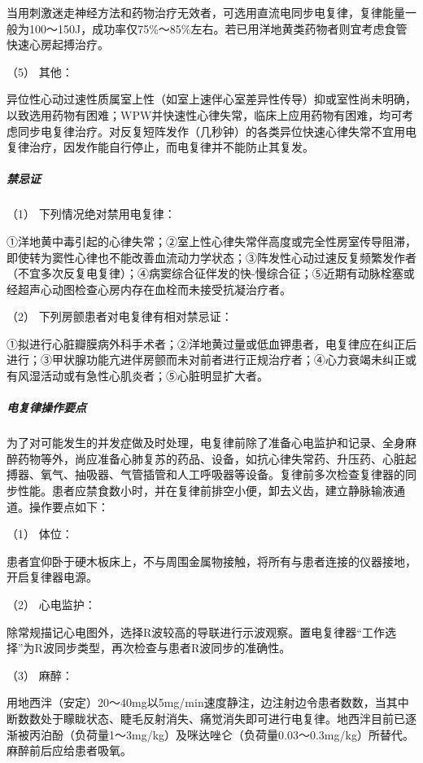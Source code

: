 当用刺激迷走神经方法和药物治疗无效者，可选用直流电同步电复律，复律能量一般为100～150J，成功率仅75\%～85\%左右。若已用洋地黄类药物者则宜考虑食管快速心房起搏治疗。

\hypertarget{text00373.htmlux5cux23CHP16-4-4-1-5}{}
（5） 其他：

异位性心动过速性质属室上性（如室上速伴心室差异性传导）抑或室性尚未明确，以致选用药物有困难；WPW并快速性心律失常，临床上应用药物有困难，均可考虑同步电复律治疗。对反复短阵发作（几秒钟）的各类异位快速心律失常不宜用电复律治疗，因发作能自行停止，而电复律并不能防止其复发。

\subparagraph{禁忌证}

\hypertarget{text00373.htmlux5cux23CHP16-4-4-2-1}{}
（1） 下列情况绝对禁用电复律：

①洋地黄中毒引起的心律失常；②室上性心律失常伴高度或完全性房室传导阻滞，即使转为窦性心律也不能改善血流动力学状态；③阵发性心动过速反复频繁发作者（不宜多次反复电复律）；④病窦综合征伴发的快-慢综合征；⑤近期有动脉栓塞或经超声心动图检查心房内存在血栓而未接受抗凝治疗者。

\hypertarget{text00373.htmlux5cux23CHP16-4-4-2-2}{}
（2） 下列房颤患者对电复律有相对禁忌证：

①拟进行心脏瓣膜病外科手术者；②洋地黄过量或低血钾患者，电复律应在纠正后进行；③甲状腺功能亢进伴房颤而未对前者进行正规治疗者；④心力衰竭未纠正或有风湿活动或有急性心肌炎者；⑤心脏明显扩大者。

\subparagraph{电复律操作要点}

为了对可能发生的并发症做及时处理，电复律前除了准备心电监护和记录、全身麻醉药物等外，尚应准备心肺复苏的药品、设备，如抗心律失常药、升压药、心脏起搏器、氧气、抽吸器、气管插管和人工呼吸器等设备。复律前多次检查复律器的同步性能。患者应禁食数小时，并在复律前排空小便，卸去义齿，建立静脉输液通道。操作要点如下：

\hypertarget{text00373.htmlux5cux23CHP16-4-4-3-1}{}
（1） 体位：

患者宜仰卧于硬木板床上，不与周围金属物接触，将所有与患者连接的仪器接地，开启复律器电源。

\hypertarget{text00373.htmlux5cux23CHP16-4-4-3-2}{}
（2） 心电监护：

除常规描记心电图外，选择R波较高的导联进行示波观察。置电复律器“工作选择”为R波同步类型，再次检查与患者R波同步的准确性。

\hypertarget{text00373.htmlux5cux23CHP16-4-4-3-3}{}
（3） 麻醉：

用地西泮（安定）20～40mg以5mg/min速度静注，边注射边令患者数数，当其中断数数处于矇眬状态、睫毛反射消失、痛觉消失即可进行电复律。地西泮目前已逐渐被丙泊酚（负荷量1～3mg/kg）及咪达唑仑（负荷量0.03～0.3mg/kg）所替代。麻醉前后应给患者吸氧。

